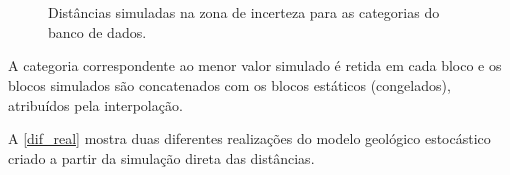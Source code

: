 \begin{figure}[H] 
    \caption{Distâncias simuladas na zona de incerteza para as categorias do banco de dados.} \label{dist_sim_u}
     \centering
     \\
     \\
\end{figure}

A categoria correspondente ao menor valor simulado é retida em cada bloco e os blocos simulados são concatenados com os blocos estáticos (congelados), atribuídos pela interpolação.

A \autoref{dif_real} mostra duas diferentes realizações do modelo geológico estocástico criado a partir da simulação direta das distâncias.

